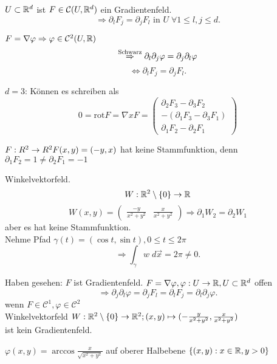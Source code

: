 \documentclass[../ana2.tex]{subfiles}
\begin{document}
\begin{satz}[Rotationsfreiheit]
    \( U \subset \mathbb{R}^d \) ist \( F \in \mathcal{C}(U, \mathbb{R}^d) \)
    ein Gradientenfeld.
    \[ \Rightarrow \partial_l F_j = \partial_j F_l \text{ in } U \;\forall 1 \leq l,j \leq d. \]
\end{satz}
\begin{bew}
    \( F = \nabla \varphi \Rightarrow \varphi \in \mathcal{C}^2(U, \mathbb{R}) \)
    \[ \overset{\text{Schwarz}}{\Rightarrow} \partial_l \partial_j \varphi = \partial_j \partial_l \varphi \]
    \[ \Leftrightarrow \partial_l F_j = \partial_j F_l. \]
\end{bew}
\( d = 3 \): Können es schreiben als 
\[ 0 = \mathrm{rot} F = \nabla x F  = \begin{pmatrix}
    \partial_2 F_3 - \partial_3 F_2 \\
    -(\partial_1 F_3 - \partial_3 F_1) \\
    \partial_1 F_2 - \partial_2 F_1 
\end{pmatrix} \]
\begin{bsp}
    \(F:R^2\rightarrow R^2  F(x,y) = (-y, x)\)
    hat keine Stammfunktion, denn \(\partial_1 F_2 = 1 \neq \partial_2 F_1 = -1\)
\end{bsp}
\begin{bsp}
    Winkelvektorfeld.
    \[ W:\mathbb{R}^2 \setminus \{0\}\rightarrow \mathbb{R} \]
    \[ W(x,y) = \begin{pmatrix}
        \frac{-y}{x^2 + y^2} & \frac{x}{x^2 + y^2}
    \end{pmatrix} \Rightarrow \partial_1 W_2 = \partial_2 W_1 \]
    aber es hat keine Stammfunktion.\\
    Nehme Pfad \( \gamma(t) = (\cos t, \sin t), 0 \leq t \leq 2\pi \)
    \[ \Rightarrow \int_\gamma w \; d\vec{x} = 2\pi \neq 0. \]
\end{bsp}
Haben gesehen: \(F\) ist Gradientenfeld. 
\( F = \nabla \varphi, \varphi:U\rightarrow \mathbb{R}, U \subset \mathbb{R}^d \) 
offen 
\[ \Rightarrow \partial_j \partial_l \varphi = \partial_j F_l = 
\partial_l F_j = \partial_l \partial_j \varphi. \] 
wenn \( F \in \mathcal{C}^1, \varphi \in \mathcal{C}^2 \)\\
Winkelvektorfeld \(W:\mathbb{R}^2 \setminus \{0\}\rightarrow \mathbb{R}^2; 
(x,y) \mapsto (-\frac{y}{x^2+y^2}, \frac{x}{x^2+y^2})\)\\
ist kein Gradientenfeld.
\begin{bsp}
    \(\varphi(x,y) = \arccos \frac{x}{\sqrt{x^2+y^2}}\)
    auf oberer Halbebene \(\{(x,y): x \in \mathbb{R}, y > 0\}\)
\end{bsp}
\end{document}
